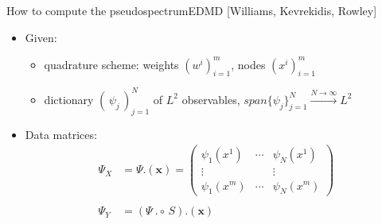 \documentclass[
  english,            %
  aspectratio=169,    %
]{tumbeamer}
\begin{document}
\begin{frame}{How to compute the pseudospectrum}{EDMD [Williams, Kevrekidis, Rowley]}
  
\begin{itemize}
  \item Given: 
  \begin{itemize}
    \item quadrature scheme: weights $(w^i)_{i=1}^m$, nodes $(x^i)_{i=1}^m$
    \item dictionary $(\, \psi_j \,)_{j=1}^N$ of $L^2$ observables, $span\{\psi_j\}_{j=1}^N \xrightarrow{N \to \infty} L^2$
  \end{itemize}
  \item Data matrices: 
  \begin{align}
    \Psi_X &= \Psi . (\mathbf{x}) = 
    \begin{pmatrix}
      \psi_1 (x^1) & \cdots & \psi_N (x^1) \\
      \vdots & & \vdots \\
      \psi_1 (x^m) & \cdots & \psi_N (x^m)
    \end{pmatrix} \\
    & \\
    \Psi_Y &= (\Psi\ .\circ \,S) . (\mathbf{x})
  \end{align}
\end{itemize}

\end{frame}
\end{document}
